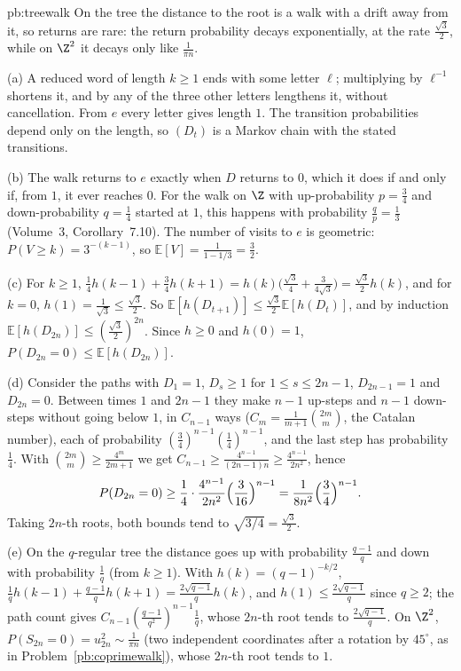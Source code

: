\begin{solution}{pb:treewalk}
\idea On the tree the distance to the root is a walk with a drift away from it, so returns are rare: the return probability decays
exponentially, at the rate $\frac{\sqrt3}2$, while on $\Z^2$ it decays only like $\frac1{\pi n}$.

\writeup (a) A reduced word of length $k\ge1$ ends with some letter $\ell$; multiplying by $\ell^{-1}$ shortens it, and by any of the three other letters
lengthens it, without cancellation. From $e$ every letter gives length $1$. The transition probabilities depend only on the length, so $(D_t)$ is
a Markov chain with the stated transitions.

(b) The walk returns to $e$ exactly when $D$ returns to $0$, which it does if and only if, from $1$, it ever reaches $0$. For the walk on $\Z$ with
up-probability $p=\frac34$ and down-probability $q=\frac14$ started at $1$, this happens with probability $\frac qp=\frac13$ (Volume~3, Corollary~7.10). The number of visits
to $e$ is geometric: $P(V\ge k)=3^{-(k-1)}$, so $\mathbb E[V]=\frac1{1-1/3}=\frac32$.

(c) For $k\ge1$, $\frac14h(k-1)+\frac34h(k+1)=h(k)\bigl(\frac{\sqrt3}4+\frac3{4\sqrt3}\bigr)=\frac{\sqrt3}2h(k)$, and for $k=0$, $h(1)=\frac1{\sqrt3}\le\frac{\sqrt3}2$. So $\mathbb E[h(D_{t+1})]\le\frac{\sqrt3}2\mathbb E[h(D_t)]$, and by induction
$\mathbb E[h(D_{2n})]\le(\frac{\sqrt3}2)^{2n}$. Since $h\ge0$ and $h(0)=1$, $P(D_{2n}=0)\le\mathbb E[h(D_{2n})]$.

(d) Consider the paths with $D_1=1$, $D_s\ge1$ for $1\le s\le2n-1$, $D_{2n-1}=1$ and $D_{2n}=0$. Between times $1$ and $2n-1$ they make $n-1$ up-steps and $n-1$ down-steps
without going below $1$, in $C_{n-1}$ ways ($C_m=\frac1{m+1}\binom{2m}m$, the Catalan number), each of probability $(\frac34)^{n-1}(\frac14)^{n-1}$, and the last step has probability
$\frac14$. With $\binom{2m}m\ge\frac{4^m}{2m+1}$ we get $C_{n-1}\ge\frac{4^{n-1}}{(2n-1)n}\ge\frac{4^{n-1}}{2n^2}$, hence
\[
P(D_{2n}=0)\ge\frac14\cdot\frac{4^{n-1}}{2n^2}\Bigl(\frac3{16}\Bigr)^{n-1}=\frac1{8n^2}\Bigl(\frac34\Bigr)^{n-1}.
\]
Taking $2n$-th roots, both bounds tend to
$\sqrt{3/4}=\frac{\sqrt3}2$.

(e) On the $q$-regular tree the distance goes up with probability $\frac{q-1}q$ and down with probability $\frac1q$ (from $k\ge1$). With $h(k)=(q-1)^{-k/2}$,
$\frac1qh(k-1)+\frac{q-1}qh(k+1)=\frac{2\sqrt{q-1}}qh(k)$, and $h(1)\le\frac{2\sqrt{q-1}}q$ since $q\ge2$; the path count gives $C_{n-1}(\frac{q-1}{q^2})^{n-1}\frac1q$, whose $2n$-th root tends to
$\frac{2\sqrt{q-1}}q$. On $\Z^2$, $P(S_{2n}=0)=u_{2n}^2\sim\frac1{\pi n}$ (two independent coordinates after a rotation by $45^\circ$, as in Problem~\ref{pb:coprimewalk}), whose $2n$-th
root tends to $1$.


\end{solution}
